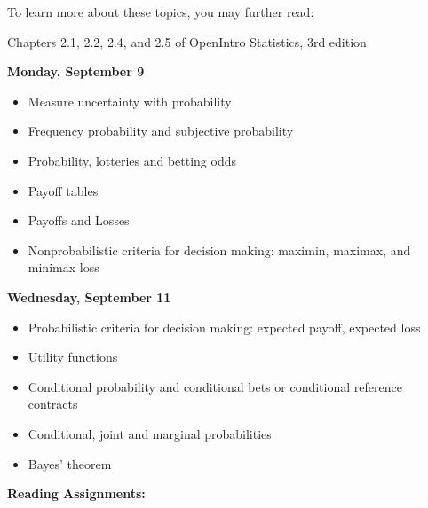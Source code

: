 \documentclass[11pt]{article}
\begin{document}
To learn more about these topics, you may further read:

Chapters 2.1, 2.2, 2.4, and 2.5 of OpenIntro Statistics, 3rd edition
%
%		

		
\vspace{7mm}
%



	\vspace{5mm}
\noindent\textbf{\large Monday, September 9} 



\begin{itemize}

\item Measure uncertainty with probability

\item Frequency probability and subjective probability
\item Probability, lotteries and betting odds
\item Payoff tables
\item Payoffs and Losses
\item Nonprobabilistic criteria for decision making: maximin, maximax, and minimax loss
\end{itemize}


\vspace{5mm}
\noindent\textbf{\large  Wednesday, September 11} 	



\begin{itemize}

\item Probabilistic criteria for decision making: expected payoff, expected loss

\item Utility functions

\item Conditional probability and conditional bets or conditional reference contracts
\item Conditional, joint and marginal probabilities
\item Bayes' theorem



\end{itemize}
\noindent\textbf{Reading Assignments:}
\end{document}
